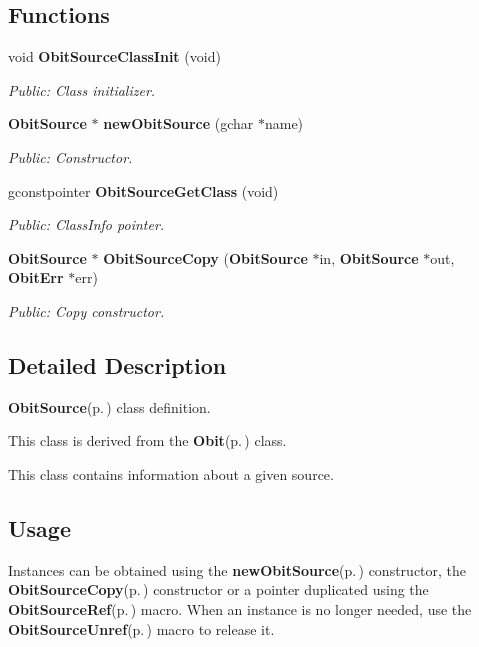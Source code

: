 \subsection*{Functions}
\begin{CompactItemize}
\item 
void {\bf Obit\-Source\-Class\-Init} (void)
\begin{CompactList}\small\item\em Public: Class initializer. \item\end{CompactList}\item 
{\bf Obit\-Source} $\ast$ {\bf new\-Obit\-Source} (gchar $\ast$name)
\begin{CompactList}\small\item\em Public: Constructor. \item\end{CompactList}\item 
gconstpointer {\bf Obit\-Source\-Get\-Class} (void)
\begin{CompactList}\small\item\em Public: Class\-Info pointer. \item\end{CompactList}\item 
{\bf Obit\-Source} $\ast$ {\bf Obit\-Source\-Copy} ({\bf Obit\-Source} $\ast$in, {\bf Obit\-Source} $\ast$out, {\bf Obit\-Err} $\ast$err)
\begin{CompactList}\small\item\em Public: Copy constructor. \item\end{CompactList}\end{CompactItemize}


\subsection{Detailed Description}
{\bf Obit\-Source}{\rm (p.\,\pageref{structObitSource})} class definition. 

This class is derived from the {\bf Obit}{\rm (p.\,\pageref{structObit})} class.

This class contains information about a given source.\subsection{Usage}\label{ObitSource_8h_ObitSourceUsage}
Instances can be obtained using the {\bf new\-Obit\-Source}{\rm (p.\,\pageref{ObitSource_8c_a6})} constructor, the {\bf Obit\-Source\-Copy}{\rm (p.\,\pageref{ObitSource_8c_a8})} constructor or a pointer duplicated using the {\bf Obit\-Source\-Ref}{\rm (p.\,\pageref{ObitSource_8h_a1})} macro. When an instance is no longer needed, use the {\bf Obit\-Source\-Unref}{\rm (p.\,\pageref{ObitSource_8h_a0})} macro to release it.

